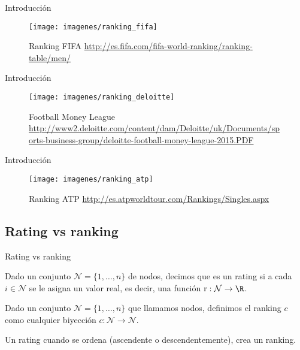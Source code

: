 \documentclass[10pt,hyperref={unicode}]{beamer}
\begin{document}
	\begin{frame}{Introducción}
		\begin{figure}
			\centering
			\texttt{[image: imagenes/ranking\_fifa]}
			\caption{Ranking FIFA \url{http://es.fifa.com/fifa-world-ranking/ranking-table/men/}}
			\label{fig:ranking_fifa}
		\end{figure}
	\end{frame}
	
	\begin{frame}{Introducción}
		\begin{figure}
			\centering
			\texttt{[image: imagenes/ranking\_deloitte]}
			\caption{Football Money League \url{http://www2.deloitte.com/content/dam/Deloitte/uk/Documents/sports-business-group/deloitte-football-money-league-2015.PDF}}
			\label{fig:ranking_deloitte}
		\end{figure}
	\end{frame}
	
	\begin{frame}{Introducción}
		\begin{figure}
			\centering
			\texttt{[image: imagenes/ranking\_atp]}
			\caption{Ranking ATP \url{http://es.atpworldtour.com/Rankings/Singles.aspx}}
			\label{fig:ranking_atp}
		\end{figure}
	\end{frame}
	
	\subsection*{Rating vs ranking}
	
	\begin{frame}{Rating vs ranking}
		\begin{defi}
			Dado un conjunto $\mathcal{N} = \{1,\dots, n\}$ de nodos, decimos que es un rating si a cada $i \in \mathcal{N}$ se le asigna un valor real, es decir, una función $\mathrm{r} : \mathcal{N} \to \R$.
		\end{defi}
		
		
		\begin{defi} \label{def:ranking}
			Dado un conjunto $\mathcal{N} = \{1,\dots,n\}$ que llamamos nodos, definimos el ranking $c$ como cualquier biyección $c : \mathcal{N} \to \mathcal{N}$.
		\end{defi}
		
		Un rating cuando se ordena (ascendente o descendentemente), crea un ranking.
	\end{frame}
	
\end{document}
